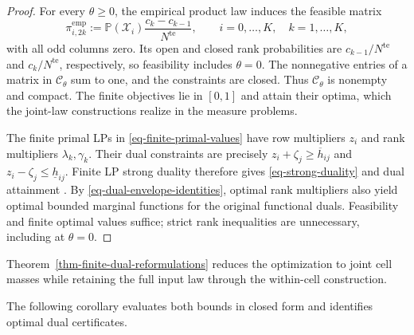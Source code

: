 \documentclass[review,11pt,3p,authoryear,nopreprintline]{elsarticle}
\begin{document}
\begin{proof}
  For every $\theta\ge0$, the empirical product law induces the feasible matrix
  \[
    \pi_{i,2k}^{\mathrm{emp}}:=\mathbb P(\mathcal X_i)\frac{c_k-c_{k-1}}{N^{\mathrm{te}}},
    \qquad i=0,\ldots,K,\quad k=1,\ldots,K,
  \]
  with all odd columns zero. Its open and closed rank probabilities are $c_{k-1}/N^{\mathrm{te}}$ and $c_k/N^{\mathrm{te}}$, respectively, so feasibility includes $\theta=0$. The nonnegative entries of a matrix in $\mathcal C_\theta$ sum to one, and the constraints are closed. Thus $\mathcal C_\theta$ is nonempty and compact. The finite objectives lie in $[0,1]$ and attain their optima, which the joint-law constructions realize in the measure problems.

  The finite primal LPs in \eqref{eq-finite-primal-values} have row multipliers $z_i$ and rank multipliers $\lambda_k,\gamma_k$. Their dual constraints are precisely $z_i+\zeta_j\ge\overline h_{ij}$ and $z_i-\zeta_j\le\underline h_{ij}$. Finite LP strong duality therefore gives \eqref{eq-strong-duality} and dual attainment \citep[Section~5.2.3]{B.V04}. By \eqref{eq-dual-envelope-identities}, optimal rank multipliers also yield optimal bounded marginal functions for the original functional duals. Feasibility and finite optimal values suffice; strict rank inequalities are unnecessary, including at $\theta=0$.
\end{proof}

Theorem~\ref{thm-finite-dual-reformulations} reduces the optimization to joint cell masses while retaining the full input law through the within-cell construction.

The following corollary evaluates both bounds in closed form and identifies optimal dual certificates.
\end{document}
